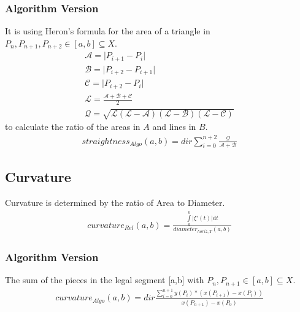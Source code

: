 \documentclass{report}
\newcommand\norm[1]{\left\lVert#1\right\rVert}
\begin{document}
\subsubsection{Algorithm Version}
It is using Heron's formula for the area of a triangle in $P_{n}, P_{n+1},P_{n+2} \in [a,b] \subseteq X$.
\begin{align*}
\mathcal{A}=\lvert P_{i+1}-P_{i} \rvert\\
\mathcal{B}=\lvert P_{i+2} - P_{i+1} \rvert\\
\mathcal{C}=\lvert P_{i+2} - P_{i} \rvert\\
\mathcal{L}=\frac{\mathcal{A}+\mathcal{B}+\mathcal{C}}{2}\\
\mathcal{Q}=\sqrt{\mathcal{L}(\mathcal{L}-\mathcal{A})(\mathcal{L}-\mathcal{B})(\mathcal{L}-\mathcal{C})}
\end{align*}
to calculate the ratio of the areas in $A$ and lines in $B$.
\begin{align}
straightness_{Algo}(a,b)=dir \sum_{i=0}^{n+2}\frac{\mathcal{Q}}{\mathcal{A}+\mathcal{B}}
\end{align}

\subsection{Curvature}
\iffalse
Because the diameter has to be calculated piece-wise, we have to set up a vector space with the turns $P_{n},P_{n+1} \in T$.
\begin{equation}
v \in (B,\norm{\cdot})
\end{equation}
Note: It is a Banach space.\\
\fi
Curvature is determined by the ratio of Area to Diameter.
\begin{align}
curvature_{Rel}(a,b) = \frac{\int \limits _{a}^{b} \lvert \xi'(t) \rvert \mathrm{d}t}{diameter_{horiz,T}(a,b)}
\end{align}
\subsubsection{Algorithm Version}
The sum of the pieces in the legal segment [a,b] with $P_{n}, P_{n+1} \in [a,b] \subseteq X$.
\begin{align}
curvature_{Algo}(a,b)= dir \frac{\sum \limits _{i=0}^{n+1}y(P_{i})*(x(P_{i+1})-x(P_{i}))}{x(P_{n+1})-x(P_{0})}
\end{align}
\end{document}
